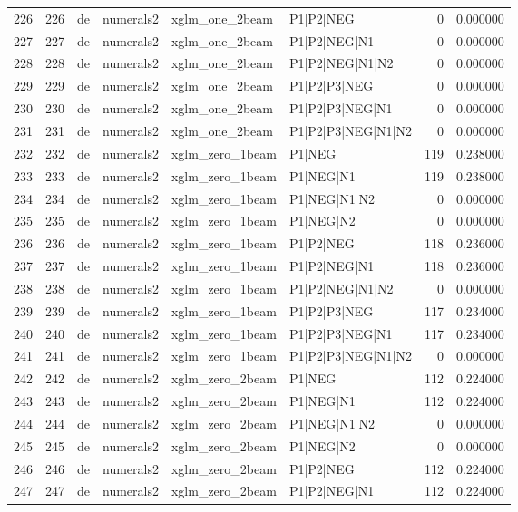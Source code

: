 \begin{tabular}{lrllllrr}
226 & 226 & de & numerals2 & xglm_one_2beam & P1|P2|NEG & 0 & 0.000000 \\
227 & 227 & de & numerals2 & xglm_one_2beam & P1|P2|NEG|N1 & 0 & 0.000000 \\
228 & 228 & de & numerals2 & xglm_one_2beam & P1|P2|NEG|N1|N2 & 0 & 0.000000 \\
229 & 229 & de & numerals2 & xglm_one_2beam & P1|P2|P3|NEG & 0 & 0.000000 \\
230 & 230 & de & numerals2 & xglm_one_2beam & P1|P2|P3|NEG|N1 & 0 & 0.000000 \\
231 & 231 & de & numerals2 & xglm_one_2beam & P1|P2|P3|NEG|N1|N2 & 0 & 0.000000 \\
232 & 232 & de & numerals2 & xglm_zero_1beam & P1|NEG & 119 & 0.238000 \\
233 & 233 & de & numerals2 & xglm_zero_1beam & P1|NEG|N1 & 119 & 0.238000 \\
234 & 234 & de & numerals2 & xglm_zero_1beam & P1|NEG|N1|N2 & 0 & 0.000000 \\
235 & 235 & de & numerals2 & xglm_zero_1beam & P1|NEG|N2 & 0 & 0.000000 \\
236 & 236 & de & numerals2 & xglm_zero_1beam & P1|P2|NEG & 118 & 0.236000 \\
237 & 237 & de & numerals2 & xglm_zero_1beam & P1|P2|NEG|N1 & 118 & 0.236000 \\
238 & 238 & de & numerals2 & xglm_zero_1beam & P1|P2|NEG|N1|N2 & 0 & 0.000000 \\
239 & 239 & de & numerals2 & xglm_zero_1beam & P1|P2|P3|NEG & 117 & 0.234000 \\
240 & 240 & de & numerals2 & xglm_zero_1beam & P1|P2|P3|NEG|N1 & 117 & 0.234000 \\
241 & 241 & de & numerals2 & xglm_zero_1beam & P1|P2|P3|NEG|N1|N2 & 0 & 0.000000 \\
242 & 242 & de & numerals2 & xglm_zero_2beam & P1|NEG & 112 & 0.224000 \\
243 & 243 & de & numerals2 & xglm_zero_2beam & P1|NEG|N1 & 112 & 0.224000 \\
244 & 244 & de & numerals2 & xglm_zero_2beam & P1|NEG|N1|N2 & 0 & 0.000000 \\
245 & 245 & de & numerals2 & xglm_zero_2beam & P1|NEG|N2 & 0 & 0.000000 \\
246 & 246 & de & numerals2 & xglm_zero_2beam & P1|P2|NEG & 112 & 0.224000 \\
247 & 247 & de & numerals2 & xglm_zero_2beam & P1|P2|NEG|N1 & 112 & 0.224000 \\

\end{tabular}
